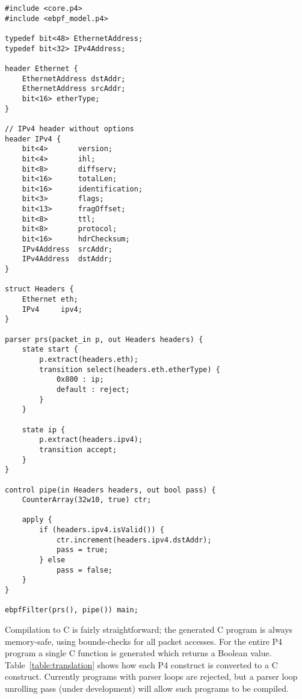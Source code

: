 \begin{lstlisting}
#include <core.p4>
#include <ebpf_model.p4>

typedef bit<48> EthernetAddress;
typedef bit<32> IPv4Address;

header Ethernet {
    EthernetAddress dstAddr;
    EthernetAddress srcAddr;
    bit<16> etherType;
}

// IPv4 header without options
header IPv4 {
    bit<4>       version;
    bit<4>       ihl;
    bit<8>       diffserv;
    bit<16>      totalLen;
    bit<16>      identification;
    bit<3>       flags;
    bit<13>      fragOffset;
    bit<8>       ttl;
    bit<8>       protocol;
    bit<16>      hdrChecksum;
    IPv4Address  srcAddr;
    IPv4Address  dstAddr;
}

struct Headers {
    Ethernet eth;
    IPv4     ipv4;
}

parser prs(packet_in p, out Headers headers) {
    state start {
        p.extract(headers.eth);
        transition select(headers.eth.etherType) {
            0x800 : ip;
            default : reject;
        }
    }

    state ip {
        p.extract(headers.ipv4);
        transition accept;
    }
}

control pipe(in Headers headers, out bool pass) {
    CounterArray(32w10, true) ctr;

    apply {
        if (headers.ipv4.isValid()) {
            ctr.increment(headers.ipv4.dstAddr);
            pass = true;
        } else
            pass = false;
    }
}

ebpfFilter(prs(), pipe()) main;
\end{lstlisting}

Compilation to C is fairly straightforward; the generated C program is
always memory-safe, using bounds-checks for all packet accesses.  For
the entire P4 program a single C function is generated which returns a
Boolean value.  Table~\ref{table:translation} shows how each P4
construct is converted to a C construct.  Currently programs with
parser loops are rejected, but a parser loop unrolling pass (under
development) will allow such programs to be compiled.

